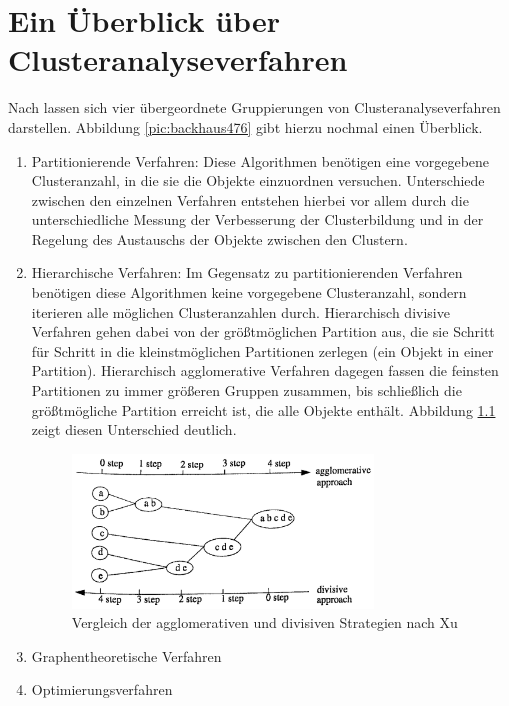 \chapter{Ein Überblick über Clusteranalyseverfahren}

Nach \citet[S. 476]{Backhaus.2016} lassen sich vier übergeordnete Gruppierungen von Clusteranalyseverfahren darstellen. Abbildung \ref{pic:backhaus476} gibt hierzu nochmal einen Überblick.

\begin{enumerate}
	\item Partitionierende Verfahren: Diese Algorithmen benötigen eine vorgegebene Clusteranzahl, in die sie die Objekte einzuordnen versuchen. Unterschiede zwischen den einzelnen Verfahren entstehen hierbei vor allem durch die unterschiedliche Messung der Verbesserung der Clusterbildung und in der Regelung des Austauschs der Objekte zwischen den Clustern.
	\item Hierarchische Verfahren: Im Gegensatz zu partitionierenden Verfahren benötigen diese Algorithmen keine vorgegebene Clusteranzahl, sondern iterieren alle möglichen Clusteranzahlen durch. Hierarchisch divisive Verfahren gehen dabei von der größtmöglichen Partition aus, die sie Schritt für Schritt in die kleinstmöglichen Partitionen zerlegen (ein Objekt in einer Partition). Hierarchisch agglomerative Verfahren dagegen fassen die feinsten Partitionen zu immer größeren Gruppen zusammen, bis schließlich die größtmögliche Partition erreicht ist, die alle Objekte enthält. Abbildung \ref{pic:xu21} zeigt diesen Unterschied deutlich.
	\begin{figure}[h]
		\begin{center}
			\includegraphics[width=8cm]{pics/xu21.png}
		\end{center}
		\caption{Vergleich der agglomerativen und divisiven Strategien nach Xu}
		\label{pic:xu21}
	\end{figure}
	\item Graphentheoretische Verfahren
	\item Optimierungsverfahren
\end{enumerate}

